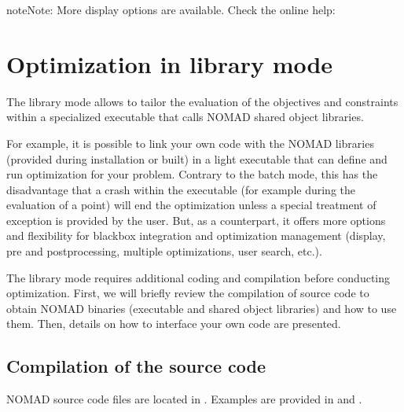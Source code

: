 \documentclass[letterpaper,10pt,english]{sphinxmanual}
\begin{document}
\begin{sphinxadmonition}{note}{Note:}
\sphinxAtStartPar
More display options are available. Check the online help: 
\end{sphinxadmonition}

\begin{sphinxShadowBox}
\end{sphinxShadowBox}


\chapter{Optimization in library mode}
\label{\detokenize{LibraryMode:optimization-in-library-mode}}\label{\detokenize{LibraryMode:library-mode}}\label{\detokenize{LibraryMode::doc}}
\sphinxAtStartPar
The library mode allows to tailor the evaluation of the objectives and constraints within a
specialized executable that calls NOMAD shared object libraries.

\sphinxAtStartPar
For example, it is possible to link your own code with the NOMAD libraries (provided during installation or built)
in a light executable that can define and run optimization for your problem. Contrary to the batch
mode, this has the disadvantage that a crash within the executable (for example during the evaluation of a point)
will end the optimization unless a special treatment of exception is provided by the user.
But, as a counterpart, it offers more options and flexibility for blackbox integration and
optimization management (display, pre\sphinxhyphen{} and post\sphinxhyphen{}processing, multiple optimizations, user search, etc.).

\sphinxAtStartPar
The library mode requires additional coding and compilation before conducting optimization.
First, we will briefly review the compilation of source code to obtain NOMAD binaries
(executable and shared object libraries) and how to use them.
Then, details on how to interface your own code are presented.


\section{Compilation of the source code}
\label{\detokenize{LibraryMode:compilation-of-the-source-code}}
\sphinxAtStartPar
NOMAD source code files are located in .
Examples are provided in  and .
\end{document}
